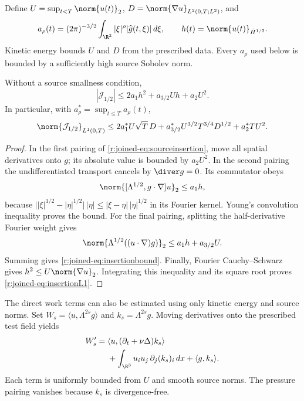 Define $U=\sup_{t<T}\norm{u(t)}_2$,
$D=\norm{\nabla u}_{L^2(0,T;L^2)}$, and
\begin{equation*}
a_\rho(t)=(2\pi)^{-3/2}\int_{\R^3}|\xi|^\rho
|\widehat g(t,\xi)|\,d\xi,\qquad
h(t)=\norm{u(t)}_{\dot H^{1/2}}.
\end{equation*}
Kinetic energy bounds $U$ and $D$ from the prescribed data. Every $a_\rho$ used below is bounded by a sufficiently high source Sobolev norm.

\begin{proposition}\label{r:joined-prop:sourceinsertion}
Without a source smallness condition,
\begin{equation}\label{r:joined-eq:insertionbound}
|\mathcal J_{1/2}|\le
2a_1h^2+a_{3/2}Uh+a_2U^2.
\end{equation}
In particular, with $a_\rho^*=\sup_{t\le T}a_\rho(t)$,
\begin{equation}\label{r:joined-eq:insertionL1}
\norm{\mathcal J_{1/2}}_{L^1(0,T)}
\le2a_1^*U\sqrt T\,D
+a_{3/2}^*U^{3/2}T^{3/4}D^{1/2}
+a_2^*TU^2.
\end{equation}
\end{proposition}
\begin{proof}
In the first pairing of \eqref{r:joined-eq:sourceinsertion}, move all spatial derivatives onto $g$; its absolute value is bounded by $a_2U^2$.
In the second pairing the undifferentiated transport cancels by $\diver g=0$. Its commutator obeys
\begin{equation*}
\norm{[\Lambda^{1/2},g\cdot\nabla]u}_2\le a_1h,
\end{equation*}
because
$\bigl||\xi|^{1/2}-|\eta|^{1/2}\bigr|\,|\eta|
\le|\xi-\eta|\,|\eta|^{1/2}$
in its Fourier kernel. Young's convolution inequality proves the bound.
For the final pairing, splitting the half-derivative Fourier weight gives
\begin{equation*}
\norm{\Lambda^{1/2}((u\cdot\nabla)g)}_2
\le a_1h+a_{3/2}U.
\end{equation*}
Summing gives \eqref{r:joined-eq:insertionbound}. Finally, Fourier Cauchy--Schwarz gives $h^2\le U\norm{\nabla u}_2$. Integrating this inequality and its square root proves \eqref{r:joined-eq:insertionL1}.
\end{proof}

The direct work terms can also be estimated using only kinetic energy and source norms. Set
$W_s=\langle u,\Lambda^{2s}g\rangle$ and $k_s=\Lambda^{2s}g$.
Moving derivatives onto the prescribed test field yields
\begin{equation}\label{r:joined-eq:workderivative}
\begin{aligned}
W_s'={}&\langle u,(\partial_t+\nu\Delta)k_s\rangle\\
&+\int_{\R^3}u_i u_j\,\partial_j(k_s)_i\,dx
+\langle g,k_s\rangle .
\end{aligned}
\end{equation}
Each term is uniformly bounded from $U$ and smooth source norms. The pressure pairing vanishes because $k_s$ is divergence-free.

